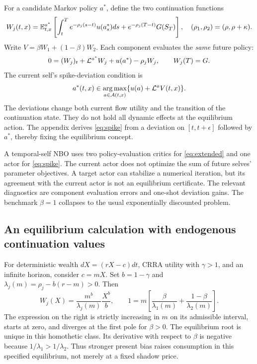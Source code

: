 For a candidate Markov policy $a^*$, define the two continuation functions
\begin{equation}\label{eq:components}
 W_j(t,x)=\mathbb E_{t,x}^{a^*}\left[\int_t^T e^{-\rho_j(s-t)}u(a_s^*)ds
             +e^{-\rho_j(T-t)}G(S_T)\right],\quad
 (\rho_1,\rho_2)=(\rho,\rho+\kappa).
\end{equation}
Write $V=\beta W_1+(1-\beta)W_2$. Each component evaluates the \emph{same} future policy:
\begin{equation}\label{eq:extended}
 0=(W_j)_t+\mathcal L^{a^*}W_j+u(a^*)-\rho_jW_j,\qquad W_j(T)=G.
\end{equation}
The current self's spike-deviation condition is
\begin{equation}\label{eq:spike}
 a^*(t,x)\in\operatorname*{arg\,max}_{a\in\mathcal A(t,x)}\{u(a)+\mathcal L^aV(t,x)\}.
\end{equation}
The deviations change both current flow utility and the transition of the continuation state. They do not hold all dynamic effects at the equilibrium action. The appendix derives \eqref{eq:spike} from a deviation on $[t,t+\epsilon]$ followed by $a^*$, thereby fixing the equilibrium concept.

A temporal-self NBO uses two policy-evaluation critics for \eqref{eq:extended} and one actor for \eqref{eq:spike}. The current actor does not optimize the sum of future selves' parameter objectives. A target actor can stabilize a numerical iteration, but its agreement with the current actor is not an equilibrium certificate. The relevant diagnostics are component evaluation errors and one-shot deviation gains. The benchmark $\beta=1$ collapses to the usual exponentially discounted problem.

\subsection{An equilibrium calculation with endogenous continuation values}
For deterministic wealth $dX=(rX-c)dt$, CRRA utility with $\gamma>1$, and an infinite horizon, consider $c=mX$. Set $b=1-\gamma$ and $\lambda_j(m)=\rho_j-b(r-m)>0$. Then
\begin{equation}\label{eq:temporalroot}
 W_j(X)=\frac{m^b}{\lambda_j(m)}\frac{X^b}{b},\qquad
 1=m\left[\frac\beta{\lambda_1(m)}+\frac{1-\beta}{\lambda_2(m)}\right].
\end{equation}
The expression on the right is strictly increasing in $m$ on its admissible interval, starts at zero, and diverges at the first pole for $\beta>0$. The equilibrium root is unique in this homothetic class. Its derivative with respect to $\beta$ is negative because $1/\lambda_1>1/\lambda_2$. Thus stronger present bias raises consumption in this specified equilibrium, not merely at a fixed shadow price.

